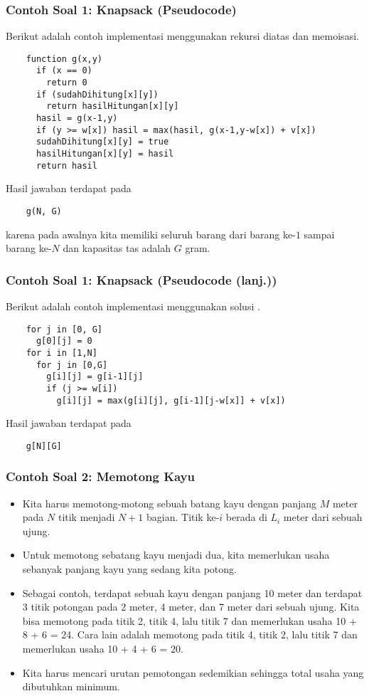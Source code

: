 \begin{frame} [fragile]
\frametitle{Contoh Soal 1: Knapsack (Pseudocode)}
  Berikut adalah contoh implementasi menggunakan rekursi diatas dan memoisasi.
  \begin{lstlisting}
    function g(x,y)
      if (x == 0)
        return 0
      if (sudahDihitung[x][y])
        return hasilHitungan[x][y]
      hasil = g(x-1,y)
      if (y >= w[x]) hasil = max(hasil, g(x-1,y-w[x]) + v[x])
      sudahDihitung[x][y] = true
      hasilHitungan[x][y] = hasil
      return hasil
  \end{lstlisting}
  Hasil jawaban terdapat pada 
  \begin{lstlisting}
    g(N, G)
  \end{lstlisting}
  karena pada awalnya kita memiliki seluruh barang dari barang ke-$1$ sampai barang ke-$N$ dan kapasitas tas adalah $G$ gram.
\end{frame}

\begin{frame} [fragile]
\frametitle{Contoh Soal 1: Knapsack (Pseudocode (lanj.))}
  Berikut adalah contoh implementasi menggunakan solusi .
  \begin{lstlisting}
    for j in [0, G]
      g[0][j] = 0
    for i in [1,N]
      for j in [0,G]
        g[i][j] = g[i-1][j]
        if (j >= w[i])
          g[i][j] = max(g[i][j], g[i-1][j-w[x]] + v[x])
  \end{lstlisting}
  Hasil jawaban terdapat pada
  \begin{lstlisting}
    g[N][G]
  \end{lstlisting}
\end{frame}

\begin{frame}
\frametitle{Contoh Soal 2: Memotong Kayu}
\begin{itemize}
  \item Kita harus memotong-motong sebuah batang kayu dengan panjang $M$ meter pada $N$ titik menjadi $N+1$ bagian. Titik ke-$i$ berada di $L_i$ meter dari sebuah ujung.
  \item Untuk memotong sebatang kayu menjadi dua, kita memerlukan usaha sebanyak panjang kayu yang sedang kita potong.
  \item Sebagai contoh, terdapat sebuah kayu dengan panjang 10 meter dan terdapat 3 titik potongan pada 2 meter, 4 meter, dan 7 meter dari sebuah ujung. Kita bisa memotong pada titik 2, titik 4, lalu titik 7 dan memerlukan usaha 10 + 8 + 6 = 24. Cara lain adalah memotong pada titik 4, titik 2, lalu titik 7 dan memerlukan usaha 10 + 4 + 6 = 20.
  \item Kita harus mencari urutan pemotongan sedemikian sehingga total usaha yang dibutuhkan minimum.
\end{itemize}
\end{frame}

